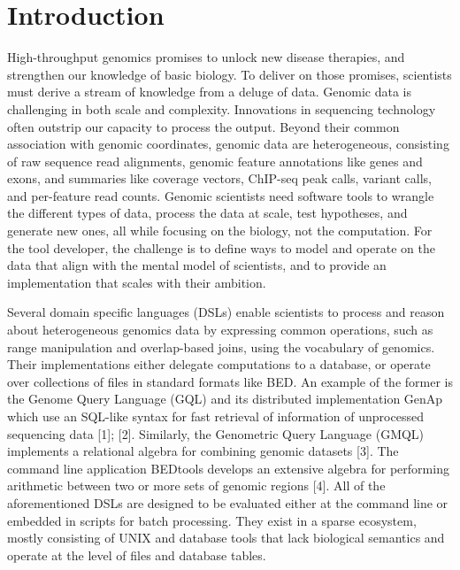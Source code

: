 \documentclass[10pt,letterpaper]{article}
\begin{document}
\linenumbers

\section{Introduction}\label{introduction}

High-throughput genomics promises to unlock new disease therapies, and
strengthen our knowledge of basic biology. To deliver on those promises,
scientists must derive a stream of knowledge from a deluge of data.
Genomic data is challenging in both scale and complexity. Innovations in
sequencing technology often outstrip our capacity to process the output.
Beyond their common association with genomic coordinates, genomic data
are heterogeneous, consisting of raw sequence read alignments, genomic
feature annotations like genes and exons, and summaries like coverage
vectors, ChIP-seq peak calls, variant calls, and per-feature read
counts. Genomic scientists need software tools to wrangle the different
types of data, process the data at scale, test hypotheses, and generate
new ones, all while focusing on the biology, not the computation. For
the tool developer, the challenge is to define ways to model and operate
on the data that align with the mental model of scientists, and to
provide an implementation that scales with their ambition.

Several domain specific languages (DSLs) enable scientists to process
and reason about heterogeneous genomics data by expressing common
operations, such as range manipulation and overlap-based joins, using
the vocabulary of genomics. Their implementations either delegate
computations to a database, or operate over collections of files in
standard formats like BED. An example of the former is the Genome Query
Language (GQL) and its distributed implementation GenAp which use an
SQL-like syntax for fast retrieval of information of unprocessed
sequencing data {[}1{]}; {[}2{]}. Similarly, the Genometric Query
Language (GMQL) implements a relational algebra for combining genomic
datasets {[}3{]}. The command line application BEDtools develops an
extensive algebra for performing arithmetic between two or more sets of
genomic regions {[}4{]}. All of the aforementioned DSLs are designed to
be evaluated either at the command line or embedded in scripts for batch
processing. They exist in a sparse ecosystem, mostly consisting of UNIX
and database tools that lack biological semantics and operate at the
level of files and database tables.
\end{document}
